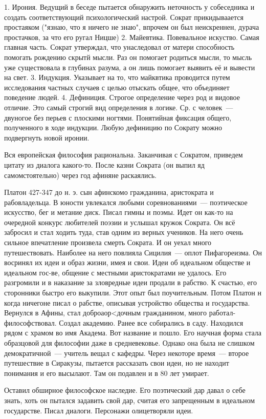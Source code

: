 	1. Ирония. Ведущий в беседе пытается обнаружить неточность у собеседника и создать соответствующий психологический настрой. 
	Сократ прикидываается простаяком ("язнаю, что я ничего не знаю", впрочем он был неискреннен, дурача простачков, за что его ругал Ницше) 
	2. Майевтика. Повевальное искуство. Самая главная часть. Сократ утверждал, что унаследовал от матери способность помогать рождению скрытй мысли. 
	Раз он помогает родиться мысли, то мысль уже существовала в глубинах разума, а он лишь помогает выявить её и вывести на свет. 
	3. Индукция. Указывает на то, что майквтика проводится путем исследования частных случаев с целью отыскать общее, что объединяет поведение людей. 
	4. Дефиниция. Строгое определение через род и видовое отличие. Это самый строгий вид определения в логике. Ср. с человек~--- двуногое без перьев с плоскими ногтями. 
	Понятийная фиксация общего, полученного в ходе индукции. Любую дефиницию по Сократу можно подвергнуть новой иронии. 

Вся европейская философия рациональна. 
Заканчивая с Сократом, приведем цитату из диалога какого-то. 
После казни Сократа (он выпил яд самомстоятельно) через год афиняне раскаялись. 

Платон
427-347 до н. э. сын афинскомо гражданина, аристократа и рабовладельца. В юности увлекался любыми соревнованиями~--- поэтическое искусство, бег и метание диск. Писал гимны и поэмы. 
Идет он как-то на очередной конкурс любителей поэзии и услышал кружок Сократа. Он всё забросил и стал ходить туда, став одним из верных учеников. На него очень сильное впечатление произвела смерть Сократа. 
И он уехал много путешествовать. Наиболее на него повлияла Сицилия~--- оплот Пифагореизма. 
Он восринял их идеи и образ жизни, имея и свои. Идеи об идеальном обществе и идеальном гос-ве, общение с местными аристократами не удалось. 
Его разгромили и в наказание за зловредные идеи продали в рабство. К счастью, его сторонники быстро его выкупили. Этот опыт был поучительным. 
Потом Платон н когда ничегоне писал о рабстве, описывая устройство общества и государства. Вернулся в Афины, стал доброаор<дочным гражданином, много работал-философствовал. 
Создал академию. Ранее все собирались в саду. Находился рядом с храмом во имя Академа. Вот название и пошло. Его научная форма стала образцовой для философии даже в средневековье. 
Однако она была не слишком демократичной~--- учитель вещал с кафедры. Через некоторе время~--- второе путешествие в Сиракузы, пытается рассказать свои идеи, но не находит понимания и его высылают. Там он подавлен и в 80 лет умирает. 

Оставил обширное философское наследие. Его поэтический дар давал о себе знать, хоть он пытался задавить свой дар, считая его запрещенным в идеальном государстве. Писал диалоги. Персонажи олицетворяли идеи. 
